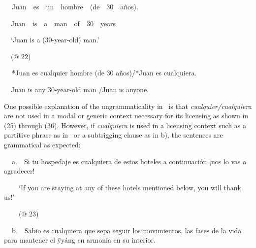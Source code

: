 \begin{styleStandard}
\textbf{\ \ }Juan\ \ es\ \ un\ \ hombre\ \ (de\ \ 30\ \ años).
\end{styleStandard}

\begin{styleStandard}
\ \ Juan\ \ is\ \ a\ \ man\ \ of\ \ 30\ \ years
\end{styleStandard}

\begin{styleStandard}
\ \ ‘Juan is a (30-year-old) man.’
\end{styleStandard}

\begin{styleStandard}
\ \ (@ 22)
\end{styleStandard}

\begin{styleStandard}
\label{bkm:Ref513974}\textbf{\ \ }*Juan es cualquier hombre (de 30 años)/*Juan es cualquiera. 
\end{styleStandard}

\begin{styleStandard}
\ \ Juan is any 30-year-old man /Juan is anyone.
\end{styleStandard}

\begin{styleStandard}
One possible explanation of the ungrammaticality in \ is that \textit{cualquier/cualquiera} are not used in a modal or generic context necessary for its licensing as shown in (25) through (36). However, if \textit{cualquiera} is used in a licensing context such as a partitive phrase as in \ or a subtrigging clause as in b), the sentences are grammatical as expected:
\end{styleStandard}

\begin{styleStandard}
\textbf{\ \ }\label{bkm:Ref57364726}a.\ \ Si tu hospedaje es cualquiera de estos hoteles a continuación ¡nos lo vas a agradecer!
\end{styleStandard}

\begin{styleStandard}
\textbf{\ \ }\ \ ‘If you are staying at any of these hotels mentioned below, you will thank us!’
\end{styleStandard}

\begin{styleStandard}
\textbf{\ \ }\ \ (@ 23)
\end{styleStandard}

\begin{styleStandard}
\textbf{\ \ }b.\ \ Sabio es cualquiera que sepa seguir los movimientos, las fases de la vida para mantener el y\=\in yáng en armonía en su interior.
\end{styleStandard}

